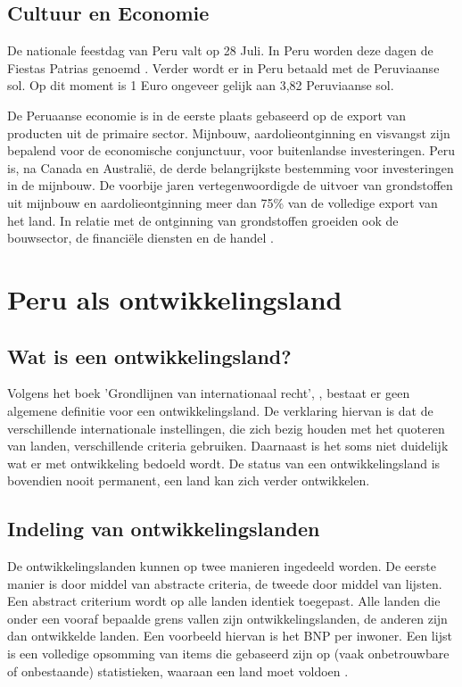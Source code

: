 \subsection{Cultuur en Economie}
De nationale feestdag van Peru valt op 28 Juli. In Peru worden deze dagen de Fiestas Patrias genoemd \autocite{dosmanosperu2018}. Verder wordt er in Peru betaald met de Peruviaanse sol. Op dit moment is 1 Euro ongeveer gelijk aan 3,82 Peruviaanse sol.

De Peruaanse economie is in de eerste plaats gebaseerd op de export van producten uit de primaire sector. Mijnbouw, aardolieontginning en visvangst zijn bepalend voor de economische conjunctuur, voor buitenlandse investeringen. Peru is, na Canada en Australië, de derde belangrijkste bestemming voor investeringen in de mijnbouw. De voorbije jaren vertegenwoordigde de uitvoer van grondstoffen uit mijnbouw en aardolieontginning meer dan 75\% van de volledige export van het land. In relatie met de ontginning van grondstoffen groeiden ook de bouwsector, de financiële diensten en de handel  \autocite{UCOS2020}.

\section{Peru als ontwikkelingsland}
\subsection{Wat is een ontwikkelingsland?}
Volgens het boek 'Grondlijnen van internationaal recht', \autocite{MarcJ.Bossuyt2005}, bestaat er geen algemene definitie voor een ontwikkelingsland. De verklaring hiervan is dat de verschillende internationale instellingen, die zich bezig houden met het quoteren van landen, verschillende criteria gebruiken. Daarnaast is het soms niet duidelijk wat er met ontwikkeling bedoeld wordt. De status van een ontwikkelingsland is bovendien nooit permanent, een land kan zich verder ontwikkelen.

\subsection{Indeling van ontwikkelingslanden}
De ontwikkelingslanden kunnen op twee manieren ingedeeld worden. De eerste manier is door middel van abstracte criteria, de tweede door middel van lijsten. Een abstract criterium wordt op alle landen identiek toegepast. Alle landen die onder een vooraf bepaalde grens vallen zijn ontwikkelingslanden, de anderen zijn dan ontwikkelde landen. Een voorbeeld hiervan is het BNP per inwoner. Een lijst is een volledige opsomming van items die gebaseerd zijn op (vaak onbetrouwbare of onbestaande) statistieken, waaraan een land moet voldoen \autocite{MarcJ.Bossuyt2005}.

